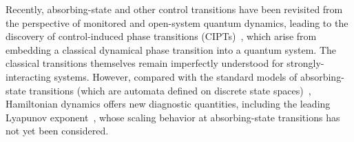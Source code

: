 \documentclass[twocolumn,amsmath,amssymb,floatfix,superscriptaddress,aps,prl]{revtex4-2}
\begin{document}
Recently, absorbing-state and other control transitions have been revisited from the perspective of monitored and open-system quantum dynamics, leading to the discovery of control-induced phase transitions (CIPTs)~\cite{iadecola2023measurement,lemaire2024separate,pan2024local,piroli2023triviality, sierant2023controlling,odea2024entanglement,ravindranath2023entanglement,thompson2024population,chertkov2023characterizing,pokharel2025order,MP2026}, which arise from embedding  a classical dynamical phase transition into a quantum system.
%
The classical transitions themselves remain imperfectly understood for strongly-interacting systems. However, compared with the standard models of absorbing-state transitions (which are automata defined on discrete state spaces)~\cite{tauber2014critical}, Hamiltonian dynamics offers new diagnostic %
quantities, including the leading Lyapunov exponent~\cite{pikovsky2016lyapunov}, whose scaling behavior at absorbing-state transitions has not yet been considered.



%
%
%
%
\end{document}
